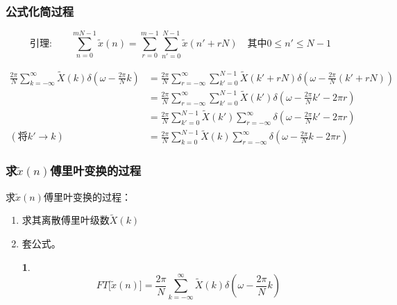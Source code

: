 \documentclass[notheorems,compress,mathserif,table]{beamer}
\newtheorem{dablock}{}
\begin{document}
\begin{frame}[shrink]\frametitle{公式化简过程}%
$$
\mbox{引理:}\qquad          \sum_{n=0}^{mN-1}\tilde{x}(n) =
\sum_{r=0}^{m-1}\sum_{n'=0}^{N-1}\tilde{x}(n'+rN) \quad\mbox{其中$0\leqslant n'\leqslant N-1$}
$$

\begin{equation*}
\begin{split}
\frac{2\pi}{N}\sum_{k=-\infty}^{\infty}\tilde{X}(k)\delta(\omega-\frac{2\pi}{N}k)
&= \frac{2\pi}{N}\sum_{r=-\infty}^{\infty}\sum_{k'=0}^{N-1}\tilde{X}(k'+rN)\delta(\omega-\frac{2\pi}{N}(k'+rN))\\
&= \frac{2\pi}{N}\sum_{r=-\infty}^{\infty}\sum_{k'=0}^{N-1}\tilde{X}(k') \delta(\omega-\frac{2\pi}{N}k'-2\pi r)\\
&= \frac{2\pi}{N}\sum_{k'=0}^{N-1}\tilde{X}(k')\sum_{r=-\infty}^{\infty}\delta(\omega-\frac{2\pi}{N}k'-2\pi r)\\
(\mbox{将}  k'\rightarrow k) \qquad
&= \frac{2\pi}{N}\sum_{k=0}^{N-1}\tilde{X}(k)\sum_{r=-\infty}^{\infty}\delta(\omega-\frac{2\pi}{N}k-2\pi r)
\end{split}
\end{equation*}

\end{frame}



\begin{frame}[shrink]\frametitle{求$\tilde{x}(n)$傅里叶变换的过程}%
求$\tilde{x}(n)$傅里叶变换的过程：

\begin{enumerate}
\item 求其离散傅里叶级数$\tilde{X}(k)$%
\item 套公式。
\begin{dablock}
$$FT\big[\tilde{x}(n)\big] = \frac{2\pi}{N}\sum_{k=-\infty}^{\infty}\tilde{X}(k)\delta(\omega-\frac{2\pi}{N}k)$$
\end{dablock}
\end{enumerate}
\end{frame}
\end{document}

